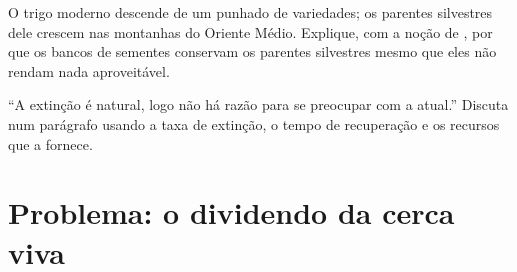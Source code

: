 \begin{exercise}[$\star\star\star$]\label{exo:g10:biodiversity-scales:14}
O trigo moderno descende de um punhado de variedades; os parentes
silvestres dele crescem nas montanhas do Oriente Médio. Explique, com a
noção de , por que os bancos de sementes conservam
os parentes silvestres mesmo que eles não rendam nada aproveitável.
\end{exercise}

\begin{exercise}[$\star\star\star$]\label{exo:g10:biodiversity-scales:15}
``A extinção é natural, logo não há razão para se preocupar com a
atual.'' Discuta num parágrafo usando a taxa de extinção, o tempo de
recuperação e os recursos que a  fornece.
\end{exercise}

\section{Problema: o dividendo da cerca viva}

